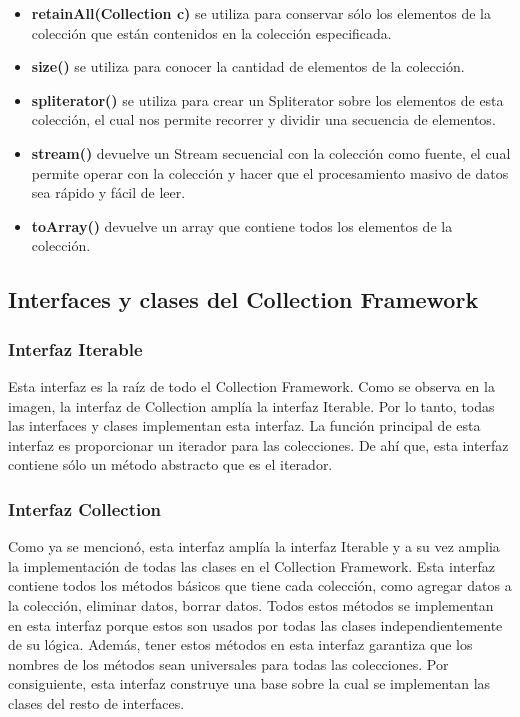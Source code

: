 \documentclass{report}
\begin{document}
\begin{itemize}
    \item \textbf{retainAll(Collection c)} se utiliza para conservar sólo los elementos de la colección que están contenidos en la colección especificada.
    \item \textbf{size()} se utiliza para conocer la cantidad de elementos de la colección.
    \item \textbf{spliterator()} se utiliza para crear un Spliterator sobre los elementos de esta colección, el cual nos permite recorrer y dividir una secuencia de elementos.
    \item \textbf{stream()} devuelve un Stream secuencial con la  colección como fuente, el cual permite operar con la colección y hacer que el procesamiento masivo de datos sea rápido y fácil de leer.
    \item \textbf{toArray()} devuelve un array que contiene todos los elementos de la colección.
\end{itemize}
    \subsection*{Interfaces y clases del Collection Framework}
     
    \subsubsection*{Interfaz Iterable}
Esta interfaz es la raíz de todo el Collection Framework. Como se observa en la imagen, la interfaz de Collection amplía la interfaz Iterable. Por lo tanto, todas las interfaces y clases implementan esta interfaz. La función principal de esta interfaz es proporcionar un iterador para las colecciones. De ahí que, esta interfaz contiene sólo un método abstracto que es el iterador.
\subsubsection{Interfaz Collection}
Como ya se mencionó, esta interfaz amplía la interfaz Iterable y a su vez amplia la implementación de todas las clases en el Collection Framework. Esta interfaz contiene todos los métodos básicos que tiene cada colección, como agregar datos a la colección, eliminar datos, borrar datos. Todos estos métodos se implementan en esta interfaz porque estos son usados por todas las clases independientemente de su lógica. Además, tener estos métodos en esta interfaz garantiza que los nombres de los métodos sean universales para todas las colecciones. Por consiguiente, esta interfaz construye una base sobre la cual se implementan las clases del resto de interfaces.
\end{document}

